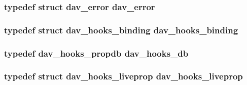 \subsubsection[{\texorpdfstring{dav\+\_\+error}{dav_error}}]{\setlength{\rightskip}{0pt plus 5cm}typedef struct {\bf dav\+\_\+error}  {\bf dav\+\_\+error}}\hypertarget{group__MOD__DAV_gaaca09776e4b1d7ae7844e1c331e4e152}{}\label{group__MOD__DAV_gaaca09776e4b1d7ae7844e1c331e4e152}
\subsubsection[{\texorpdfstring{dav\+\_\+hooks\+\_\+binding}{dav_hooks_binding}}]{\setlength{\rightskip}{0pt plus 5cm}typedef struct {\bf dav\+\_\+hooks\+\_\+binding} {\bf dav\+\_\+hooks\+\_\+binding}}\hypertarget{group__MOD__DAV_gaf0e1094c9919b7bde611cbb9e2456f4e}{}\label{group__MOD__DAV_gaf0e1094c9919b7bde611cbb9e2456f4e}
\subsubsection[{\texorpdfstring{dav\+\_\+hooks\+\_\+db}{dav_hooks_db}}]{\setlength{\rightskip}{0pt plus 5cm}typedef {\bf dav\+\_\+hooks\+\_\+propdb} {\bf dav\+\_\+hooks\+\_\+db}}\hypertarget{group__MOD__DAV_gafb40434fe70df3d6b814d00757680507}{}\label{group__MOD__DAV_gafb40434fe70df3d6b814d00757680507}
\subsubsection[{\texorpdfstring{dav\+\_\+hooks\+\_\+liveprop}{dav_hooks_liveprop}}]{\setlength{\rightskip}{0pt plus 5cm}typedef struct {\bf dav\+\_\+hooks\+\_\+liveprop} {\bf dav\+\_\+hooks\+\_\+liveprop}}\hypertarget{group__MOD__DAV_ga866619ce3e7106716a7b418dc491b2f4}{}\label{group__MOD__DAV_ga866619ce3e7106716a7b418dc491b2f4}

